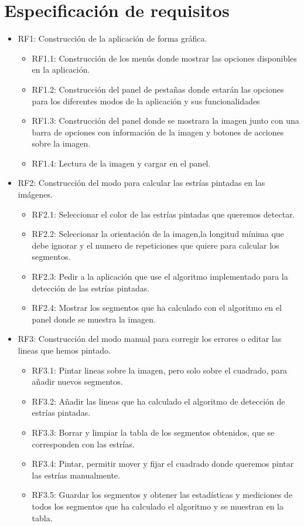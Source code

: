 \section{Especificación de requisitos}
\begin{itemize}
	 
\item RF1: Construcción de la aplicación de forma gráfica.
	\begin{itemize}
		\item RF1.1: Construcción de los menús donde mostrar las opciones disponibles en la aplicación.
		\item RF1.2: Construcción del panel de pestañas donde estarán las opciones para los diferentes modos de la aplicación y sus funcionalidades
		\item RF1.3: Construcción del panel donde se mostrara la imagen junto con una barra de opciones con información de la imagen y botones de acciones sobre la imagen.
		\item RF1.4: Lectura de la imagen y cargar en el panel.
	\end{itemize}

\item RF2: Construcción del modo para calcular las estrías pintadas en las imágenes.
	\begin{itemize}
		\item RF2.1: Seleccionar el color de las estrías pintadas que queremos detectar.
		\item RF2.2: Seleccionar la orientación de la imagen,la longitud mínima que debe ignorar y el numero de repeticiones que quiere para calcular los segmentos.
		\item RF2.3: Pedir a la aplicación que use el algoritmo implementado para la detección de las estrías pintadas.			 
		\item RF2.4: Mostrar los segmentos que ha calculado con el algoritmo en el panel donde se muestra la imagen.
	\end{itemize}

\item RF3: Construcción del modo manual para corregir los errores o editar las lineas que hemos pintado.
	\begin{itemize}
		\item RF3.1: Pintar lineas sobre la imagen, pero solo sobre el cuadrado, para añadir nuevos segmentos.
		\item RF3.2: Añadir las lineas que ha calculado el algoritmo de detección de estrías pintadas.
		\item RF3.3: Borrar y limpiar la tabla de los segmentos obtenidos, que se corresponden con las estrías.
		\item RF3.4: Pintar, permitir mover y fijar el cuadrado donde queremos pintar las estrías manualmente.
		\item RF3.5: Guardar los segmentos y obtener las estadísticas y mediciones de todos los segmentos que ha calculado el algoritmo y se muestran en la tabla.			
	\end{itemize}
			 

\end{itemize}
